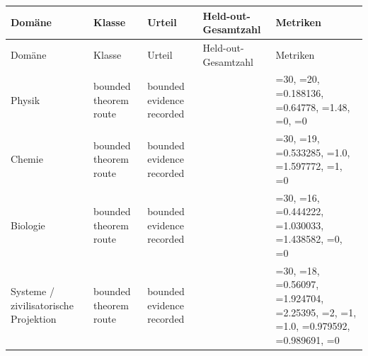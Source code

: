 \begin{longtable}{@{}L{0.17\textwidth}L{0.11\textwidth}L{0.11\textwidth}L{0.09\textwidth}L{0.36\textwidth}@{}}
\toprule
Domäne & Klasse & Urteil & Held-out-Gesamtzahl & Metriken \\
\midrule
\endfirsthead
\toprule
Domäne & Klasse & Urteil & Held-out-Gesamtzahl & Metriken \\
\midrule
\endhead
Physik & bounded theorem route & bounded evidence recorded &  & =30, \allowbreak {}=20, \allowbreak {}=0.188136, \allowbreak {}=0.64778, \allowbreak {}=1.48, \allowbreak {}=0, \allowbreak {}=0 \\
Chemie & bounded theorem route & bounded evidence recorded &  & =30, \allowbreak {}=19, \allowbreak {}=0.533285, \allowbreak {}=1.0, \allowbreak {}=1.597772, \allowbreak {}=1, \allowbreak {}=0 \\
Biologie & bounded theorem route & bounded evidence recorded &  & =30, \allowbreak {}=16, \allowbreak {}=0.444222, \allowbreak {}=1.030033, \allowbreak {}=1.438582, \allowbreak {}=0, \allowbreak {}=0 \\
Systeme / zivilisatorische Projektion & bounded theorem route & bounded evidence recorded &  & =30, \allowbreak {}=18, \allowbreak {}=0.56097, \allowbreak {}=1.924704, \allowbreak {}=2.25395, \allowbreak {}=2, \allowbreak {}=1, \allowbreak {}=1.0, \allowbreak {}=0.979592, \allowbreak {}=0.989691, \allowbreak {}=0 \\
\bottomrule
\end{longtable}
